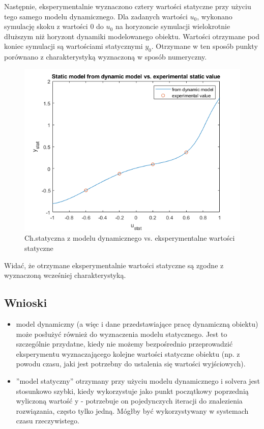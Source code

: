 Następnie, eksperymentalnie wyznaczono cztery wartości statyczne przy użyciu tego samego modelu dynamicznego. Dla zadanych wartości $u_{0}$, wykonano symulację skoku z wartości 0 do $u_{0}$ na horyzoncie symulacji wielokrotnie dłuższym niż horyzont dynamiki modelowanego obiektu. Wartości otrzymane pod koniec symulacji są wartościami statycznymi $y_{0}$. Otrzymane w ten sposób punkty porównano z charakterystyką wyznaczoną w sposób numeryczny.
\begin{figure}[H]
\centering
\includegraphics[width=15cm]{images/static_dynamic_vs_experiment.png}
\caption{Ch.statyczna z modelu dynamicznego vs. eksperymentalne wartości statyczne}
\label{fig:static_dynamic_vs_experiment}
\end{figure}
Widać, że otrzymane eksperymentalnie wartości statyczne są zgodne z wyznaczoną wcześniej charakterystyką.
\subsection{Wnioski}
\begin{itemize}
\item model dynamiczny (a więc i dane przedstawiające pracę dynamiczną obiektu) może posłużyć również do wyznaczenia modelu statycznego. Jest to szczególnie przydatne, kiedy nie możemy bezpośrednio przeprowadzić eksperymentu wyznaczającego kolejne wartości statyczne obiektu (np. z powodu czasu, jaki jest potrzebny do ustalenia się wartości wyjściowych).
\item ''model statyczny'' otrzymany przy użyciu modelu dynamicznego i solvera jest stosunkowo szybki, kiedy wykorzystuje jako punkt początkowy poprzednią wyliczoną wartość y - potrzebuje on pojedynczych iteracji do znalezienia rozwiązania, często tylko jedną. Mógłby być wykorzystywany w systemach czasu rzeczywistego.
\end{itemize}
